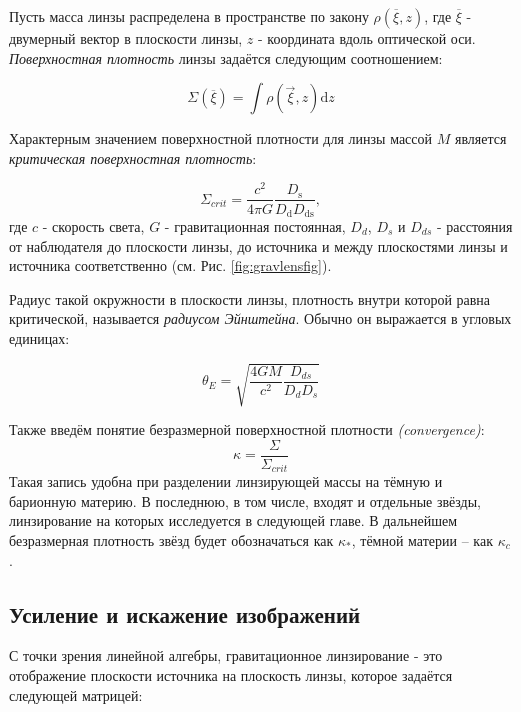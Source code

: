 Пусть масса линзы распределена в пространстве по закону $\rho(\overline \xi, z)$, где $\overline \xi$ - двумерный вектор в плоскости линзы, $z$ - координата вдоль оптической оси. \textit{Поверхностная плотность} линзы задаётся следующим соотношением:

\begin{equation}\label{sigmasurf}
\Sigma(\overline{\xi})=\int \rho(\vec{\xi}, z) \mathrm{d} z
\end{equation}

Характерным значением поверхностной плотности для линзы массой $M$ является \textit{критическая поверхностная плотность}:

\begin{equation}\label{sigmacrit}
\Sigma_{crit}=\frac{c^{2}}{4 \pi G} \frac{D_{\mathrm{s}}}{D_{\mathrm{d}} D_{\mathrm{ds}}},
\end{equation}
где $c$ - скорость света, $G$ - гравитационная постоянная, $D_d$, $D_s$ и $D_{ds}$ - расстояния от наблюдателя до плоскости линзы, до источника и между плоскостями линзы и источника соответственно (см. Рис. \ref{fig:gravlensfig}).

Радиус такой окружности в плоскости линзы, плотность внутри которой равна критической, называется \textit{радиусом Эйнштейна}. Обычно он выражается в угловых единицах: 

\begin{equation}\label{r_ein}
\theta_{E}=\sqrt{\frac{4 G M}{c^{2}} \frac{D_{d s}}{D_{d} D_{s}}}
\end{equation}

Также введём понятие безразмерной поверхностной плотности \textit{(convergence)}:
\begin{equation}\label{convergence}
\kappa = \frac{\Sigma}{\Sigma_{crit}}
\end{equation}
Такая запись удобна при разделении линзирующей массы на тёмную и барионную материю. В последнюю, в том числе, входят и отдельные звёзды, линзирование на которых исследуется в следующей главе. В дальнейшем безразмерная плотность звёзд будет обозначаться как $\kappa_*$, тёмной материи -- как $\kappa_c$.

\subsection{Усиление и искажение изображений}

С точки зрения линейной алгебры, гравитационное линзирование - это отображение плоскости источника на плоскость линзы, которое задаётся следующей матрицей:

